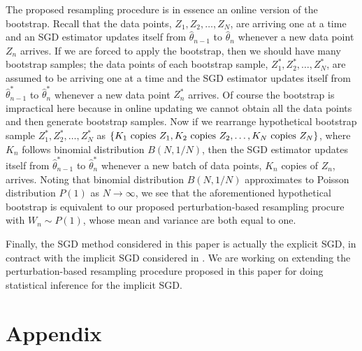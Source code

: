 \documentclass[12pt]{article}
\def\wh{\widehat}
\begin{document}
The proposed resampling procedure is in essence an online version of the bootstrap. Recall that the data points, $Z_1, Z_2, \dots, Z_N$, are arriving one at a time and an SGD estimator updates itself from $\wh{\theta}_{n-1}$ to $\wh{\theta}_n$ whenever a new data point $Z_n$ arrives. If we are forced to apply the bootstrap, then we should have many bootstrap samples; the data points of each bootstrap sample, $Z_1^*, Z_2^*, \dots, Z_N^*$, are assumed to be arriving one at a time and the SGD estimator updates itself from $\wh{\theta}^*_{n-1}$ to $\wh{\theta}^*_n$ whenever a new data point $Z_n^*$ arrives. Of course the bootstrap is impractical here because in online updating we cannot obtain all the data points and then generate bootstrap samples. Now if we rearrange hypothetical bootstrap sample $Z_1^*, Z_2^*, \dots, Z_N^*$ as $\{K_1 {\rm \ copies\ } Z_1, K_2 {\rm \ copies\ } Z_2, \dots, K_N {\rm \ copies\ } Z_N\}$, where $K_n$ follows binomial distribution $B(N, 1/N)$, then the SGD estimator updates itself from $\wh{\theta}^*_{n-1}$ to $\wh{\theta}^*_n$ whenever a new batch of data points, $K_n$ copies of $Z_n$, arrives. Noting that binomial distribution $B(N, 1/N)$ approximates to Poisson distribution $P(1)$ as $N\rightarrow\infty$, we see that the aforementioned hypothetical bootstrap is equivalent to our proposed perturbation-based resampling procure with $W_n\sim P(1)$, whose mean and variance are both equal to one.

Finally, the SGD method considered in this paper is actually the explicit SGD, in contract with the implicit SGD considered in \cite{toulis2014asymptotic}. We are working on extending the perturbation-based resampling procedure proposed in this paper for doing statistical inference for the implicit SGD.


\section*{Appendix}
\renewcommand{\theequation}{A.\arabic{equation}}
\setcounter{equation}{0}
\end{document}
